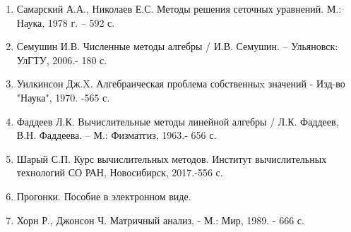 \begin{enumerate}
        \item Самарский А.А., Николаев Е.С. Методы решения сеточных уравнений. М.: Наука, 1978 г. – 592 с.
        \item Семушин И.В. Численные методы алгебры / И.В. Семушин. – Ульяновск: УлГТУ, 2006.- 180 с.
        \item Уилкинсон Дж.X. Алгебраическая проблема собственныx значений - Изд-во "Наука", 1970. -565 с.
        \item Фаддеев Л.К. Вычислительные методы линейной алгебры / Л.К. Фаддеев, В.Н. Фаддеева. – М.: Физматгиз, 1963.- 656 с.
        \item Шарый С.П. Курс вычислительных методов. Институт вычислительных технологий СО РАН, Новосибирск, 2017.-556 с.
        \item Прогонки. Пособие в электронном виде.
        \item Хорн Р., Джонсон Ч. Матричный анализ, - М.: Мир, 1989. - 666 с.
    \end{enumerate}